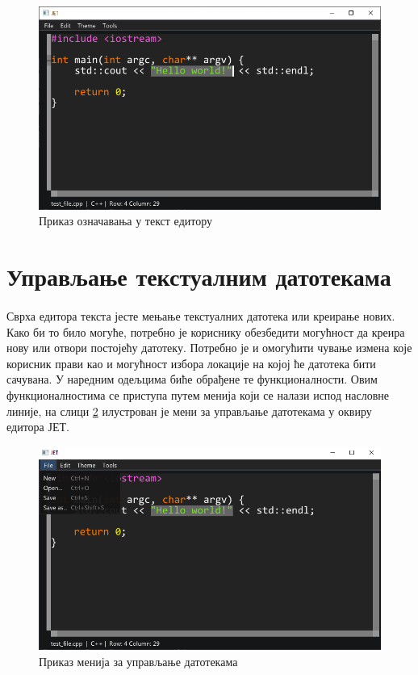 \documentclass[12pt,oneside]{memoir}
\begin{document}
\begin{figure}[!ht]
	\centering
	\includegraphics[width=1.0\textwidth]{images/selection.png}
	\caption{Приказ означавања у текст едитору}
	\label{fig:selection}
\end{figure}

\section{Управљање текстуалним датотекама}
\paragraph{}
Сврха едитора текста јесте мењање текстуалних датотека или креирање нових. 
Како би то било могуће, потребно је кориснику обезбедити могућност да креира нову или 
отвори постојећу датотеку. Потребно је и омогућити чување измена које корисник
прави као и могућност избора локације на којој ће датотека бити сачувана. У наредним 
одељцима биће обрађене те функционалности. Овим функционалностима се приступа путем
менија који се налази испод насловне линије, на слици \ref{fig:file_menu} илустрован је мени за управљање датотекама у оквиру едитора ЈЕТ.

\begin{figure}[!ht]
	\centering
	\includegraphics[width=1.0\textwidth]{images/file_menu.png}
	\caption{Приказ менија за управљање датотекама}
	\label{fig:file_menu}
\end{figure}
\end{document}
